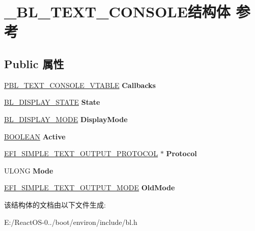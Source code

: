 \hypertarget{struct___b_l___t_e_x_t___c_o_n_s_o_l_e}{}\section{\+\_\+\+B\+L\+\_\+\+T\+E\+X\+T\+\_\+\+C\+O\+N\+S\+O\+L\+E结构体 参考}
\label{struct___b_l___t_e_x_t___c_o_n_s_o_l_e}
\subsection*{Public 属性}
\begin{DoxyCompactItemize}
\item 
\mbox{\label{struct___b_l___t_e_x_t___c_o_n_s_o_l_e_a49815142002f4d5db62a032c4544f870}} 
\hyperlink{struct___b_l___t_e_x_t___c_o_n_s_o_l_e___v_t_a_b_l_e}{P\+B\+L\+\_\+\+T\+E\+X\+T\+\_\+\+C\+O\+N\+S\+O\+L\+E\+\_\+\+V\+T\+A\+B\+LE} {\bfseries Callbacks}
\item 
\mbox{\label{struct___b_l___t_e_x_t___c_o_n_s_o_l_e_ac7ec569214ad1e2bc42887226e39fb10}} 
\hyperlink{struct___b_l___d_i_s_p_l_a_y___s_t_a_t_e}{B\+L\+\_\+\+D\+I\+S\+P\+L\+A\+Y\+\_\+\+S\+T\+A\+TE} {\bfseries State}
\item 
\mbox{\label{struct___b_l___t_e_x_t___c_o_n_s_o_l_e_af4e845c25c14ab15190ab3569bba3f8c}} 
\hyperlink{struct___b_l___d_i_s_p_l_a_y___m_o_d_e}{B\+L\+\_\+\+D\+I\+S\+P\+L\+A\+Y\+\_\+\+M\+O\+DE} {\bfseries Display\+Mode}
\item 
\mbox{\label{struct___b_l___t_e_x_t___c_o_n_s_o_l_e_a1257020bae77e8f6b999cda05216a119}} 
\hyperlink{_processor_bind_8h_a112e3146cb38b6ee95e64d85842e380a}{B\+O\+O\+L\+E\+AN} {\bfseries Active}
\item 
\mbox{\label{struct___b_l___t_e_x_t___c_o_n_s_o_l_e_a86f001c3e6cb47e493e3ab0239f3bc52}} 
\hyperlink{struct___e_f_i___s_i_m_p_l_e___t_e_x_t___o_u_t_p_u_t___p_r_o_t_o_c_o_l}{E\+F\+I\+\_\+\+S\+I\+M\+P\+L\+E\+\_\+\+T\+E\+X\+T\+\_\+\+O\+U\+T\+P\+U\+T\+\_\+\+P\+R\+O\+T\+O\+C\+OL} $\ast$ {\bfseries Protocol}
\item 
\mbox{\label{struct___b_l___t_e_x_t___c_o_n_s_o_l_e_a85da256a8c1af50dc60f6878e3943a67}} 
U\+L\+O\+NG {\bfseries Mode}
\item 
\mbox{\label{struct___b_l___t_e_x_t___c_o_n_s_o_l_e_a35d0c557e8de881db722c8bb8f398c39}} 
\hyperlink{struct_e_f_i___s_i_m_p_l_e___t_e_x_t___o_u_t_p_u_t___m_o_d_e}{E\+F\+I\+\_\+\+S\+I\+M\+P\+L\+E\+\_\+\+T\+E\+X\+T\+\_\+\+O\+U\+T\+P\+U\+T\+\_\+\+M\+O\+DE} {\bfseries Old\+Mode}
\end{DoxyCompactItemize}


该结构体的文档由以下文件生成\+:\begin{DoxyCompactItemize}
\item 
E\+:/\+React\+O\+S-\/0../boot/environ/include/bl.\+h\end{DoxyCompactItemize}
